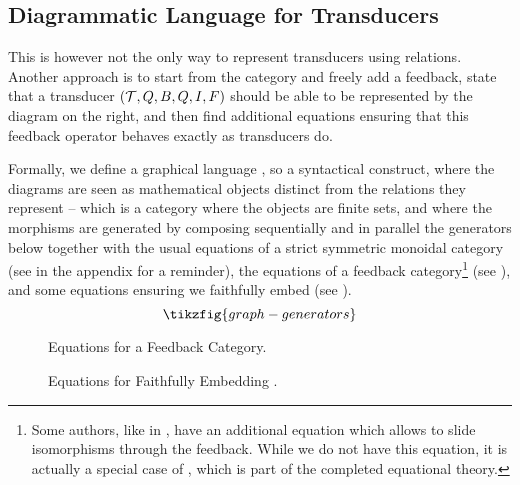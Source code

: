 \subsection{Diagrammatic Language for Transducers}\label{sec:diagrams-blue}

\begin{wrapfigure}{r}{0.2\textwidth}
\end{wrapfigure}
This is however not the only way to represent transducers using relations. Another approach is to start from the category  and freely add a feedback, state that a transducer $({\mathcal{T}},Q,B,Q,I,F)$ should be able to be represented by the diagram on the right, and then find additional equations ensuring that this feedback operator behaves exactly as transducers do.

Formally, we define a graphical language , so a syntactical construct, where the diagrams are seen as mathematical objects distinct from the relations they represent -- which is a category where the objects are finite sets, and where the morphisms are generated by composing sequentially and in parallel the generators below together with the usual equations of a strict symmetric monoidal category (see  in the appendix for a reminder), the equations of a feedback  category\footnote{Some authors, like in \cite{Katis09}, have an additional equation which allows to slide isomorphisms through the feedback. While we do not have this equation, it is actually a special case of , which is part of the completed equational theory.} (see ), and some equations ensuring we faithfully embed  (see ).
	\[\tikzfig{graph-generators}\]

\begin{figure*}
	\caption{Equations for a Feedback Category.}
	\label{fig:graph-feedback}
\end{figure*}

\begin{figure*}
	\caption{Equations for Faithfully Embedding .}
	\label{fig:graph-finrel}
\end{figure*}

